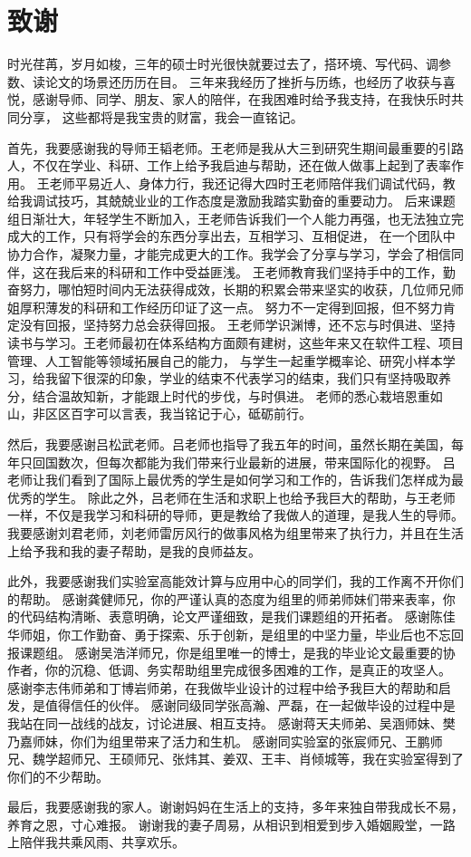 
\chapter{致谢}
时光荏苒，岁月如梭，三年的硕士时光很快就要过去了，搭环境、写代码、调参数、读论文的场景还历历在目。
三年来我经历了挫折与历练，也经历了收获与喜悦，感谢导师、同学、朋友、家人的陪伴，在我困难时给予我支持，在我快乐时共同分享，
这些都将是我宝贵的财富，我会一直铭记。

首先，我要感谢我的导师王韬老师。王老师是我从大三到研究生期间最重要的引路人，不仅在学业、科研、工作上给予我启迪与帮助，还在做人做事上起到了表率作用。
王老师平易近人、身体力行，我还记得大四时王老师陪伴我们调试代码，教给我调试技巧，其兢兢业业的工作态度是激励我踏实勤奋的重要动力。
后来课题组日渐壮大，年轻学生不断加入，王老师告诉我们一个人能力再强，也无法独立完成大的工作，只有将学会的东西分享出去，互相学习、互相促进，
在一个团队中协力合作，凝聚力量，才能完成更大的工作。我学会了分享与学习，学会了相信同伴，这在我后来的科研和工作中受益匪浅。
王老师教育我们坚持手中的工作，勤奋努力，哪怕短时间内无法获得成效，长期的积累会带来坚实的收获，几位师兄师姐厚积薄发的科研和工作经历印证了这一点。
努力不一定得到回报，但不努力肯定没有回报，坚持努力总会获得回报。
王老师学识渊博，还不忘与时俱进、坚持读书与学习。王老师最初在体系结构方面颇有建树，这些年来又在软件工程、项目管理、人工智能等领域拓展自己的能力，
与学生一起重学概率论、研究小样本学习，给我留下很深的印象，学业的结束不代表学习的结束，我们只有坚持吸取养分，结合温故知新，才能跟上时代的步伐，与时俱进。
老师的悉心栽培恩重如山，非区区百字可以言表，我当铭记于心，砥砺前行。

然后，我要感谢吕松武老师。吕老师也指导了我五年的时间，虽然长期在美国，每年只回国数次，但每次都能为我们带来行业最新的进展，带来国际化的视野。
吕老师让我们看到了国际上最优秀的学生是如何学习和工作的，告诉我们怎样成为最优秀的学生。
除此之外，吕老师在生活和求职上也给予我巨大的帮助，与王老师一样，不仅是我学习和科研的导师，更是教给了我做人的道理，是我人生的导师。
我要感谢刘君老师，刘老师雷厉风行的做事风格为组里带来了执行力，并且在生活上给予我和我的妻子帮助，是我的良师益友。

此外，我要感谢我们实验室高能效计算与应用中心的同学们，我的工作离不开你们的帮助。
感谢龚健师兄，你的严谨认真的态度为组里的师弟师妹们带来表率，你的代码结构清晰、表意明确，论文严谨细致，是我们课题组的开拓者。
感谢陈佳华师姐，你工作勤奋、勇于探索、乐于创新，是组里的中坚力量，毕业后也不忘回报课题组。
感谢吴浩洋师兄，你是组里唯一的博士，是我的毕业论文最重要的协作者，你的沉稳、低调、务实帮助组里完成很多困难的工作，是真正的攻坚人。
感谢李志伟师弟和丁博岩师弟，在我做毕业设计的过程中给予我巨大的帮助和启发，是值得信任的伙伴。
感谢同级同学张高瀚、严磊，在一起做毕设的过程中是我站在同一战线的战友，讨论进展、相互支持。
感谢蒋天夫师弟、吴涵师妹、樊乃嘉师妹，你们为组里带来了活力和生机。
感谢同实验室的张宸师兄、王鹏师兄、魏学超师兄、王硕师兄、张炜其、姜双、王丰、肖倾城等，我在实验室得到了你们的不少帮助。

最后，我要感谢我的家人。谢谢妈妈在生活上的支持，多年来独自带我成长不易，养育之恩，寸心难报。
谢谢我的妻子周易，从相识到相爱到步入婚姻殿堂，一路上陪伴我共乘风雨、共享欢乐。
